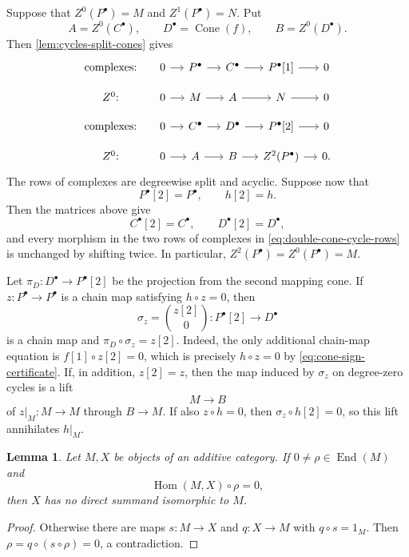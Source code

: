 \documentclass[a4paper,11pt,reqno]{amsart}
\newtheorem{lemma}[lemma]{Lemma}
\theoremstyle{definition}
\theoremstyle{plain}
\numberwithin{equation}{section}
\newcommand{\Hom}{\operatorname{Hom}}
\newcommand{\End}{\operatorname{End}}
\begin{document}
Suppose that \(Z^0(P^\bullet)=M\) and \(Z^1(P^\bullet)=N\).  Put
\[
 A=Z^0(C^\bullet),
 \qquad
 D^\bullet=\operatorname{Cone}(f),
 \qquad
 B=Z^0(D^\bullet).
\]
Then
\cref{lem:cycles-split-cones} gives
\begin{equation}
\label{eq:double-cone-cycle-rows}
\begin{tikzcd}[column sep=small,row sep=small]
\text{complexes:}&0\arrow[r]&P^\bullet\arrow[r]&C^\bullet\arrow[r]&
 P^\bullet[1]\arrow[r]&0\\
Z^0\text{:}&0\arrow[r]&M\arrow[r]&A\arrow[r]&N\arrow[r]&0\\[2pt]
\text{complexes:}&0\arrow[r]&C^\bullet\arrow[r]&D^\bullet\arrow[r]&
 P^\bullet[2]\arrow[r]&0\\
Z^0\text{:}&0\arrow[r]&A\arrow[r]&B\arrow[r]&
 Z^2(P^\bullet)\arrow[r]&0.
\end{tikzcd}
\end{equation}
The rows of complexes are degreewise split and acyclic.  Suppose now that
\[
 P^\bullet[2]=P^\bullet,
 \qquad h[2]=h.
\]
Then the matrices above give
\[
 C^\bullet[2]=C^\bullet,
 \qquad D^\bullet[2]=D^\bullet,
\]
and every morphism in the two rows of complexes in
\eqref{eq:double-cone-cycle-rows} is unchanged by shifting twice.  In particular,
\(Z^2(P^\bullet)=Z^0(P^\bullet)=M\).

Let \(\pi_D:D^\bullet\to P^\bullet[2]\) be the projection from the second
mapping cone.
If \(z:P^\bullet\to P^\bullet\) is a chain map satisfying
\(h\circ z=0\), then
\begin{equation}
\label{eq:double-cone-lift}
 \sigma_z=\binom{z[2]}{0}:P^\bullet[2]\longrightarrow D^\bullet
\end{equation}
is a chain map and \(\pi_D\circ\sigma_z=z[2]\).  Indeed, the only additional
chain-map equation is \(f[1]\circ z[2]=0\), which is precisely \(h\circ z=0\) by
\eqref{eq:cone-sign-certificate}.  If, in addition, \(z[2]=z\), then the
map induced by \(\sigma_z\) on degree-zero cycles is a lift
\[
 M\longrightarrow B
\]
of \(z|_M:M\to M\) through \(B\to M\).  If also \(z\circ h=0\), then
\(\sigma_z\circ h[2]=0\), so this lift annihilates \(h|_M\).


\begin{lemma}
\label{lem:socle-annihilation}
Let \(M,X\) be objects of an additive category.  If
\(0\ne\rho\in\End(M)\) and
\[
 \Hom(M,X)\circ\rho=0,
\]
then \(X\) has no direct summand isomorphic to \(M\).
\end{lemma}

\begin{proof}
Otherwise there are maps \(s:M\to X\) and \(q:X\to M\) with
\(q\circ s=1_M\).  Then
\(\rho=q\circ(s\circ\rho)=0\), a contradiction.
\end{proof}
\end{document}
